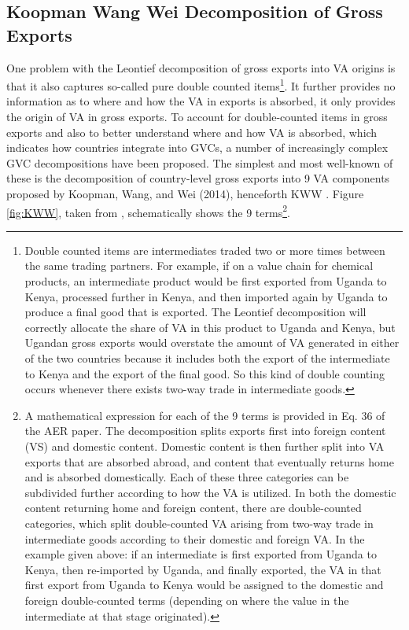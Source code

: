 \documentclass[a4paper]{article}
\begin{document}
\subsection{Koopman Wang Wei Decomposition of Gross Exports}

One problem with the Leontief decomposition of gross exports into VA origins is that it also captures so-called pure double counted items\footnote{Double counted items are intermediates traded two or more times between the same trading partners. For example, if on a value chain for chemical products, an intermediate product would be first exported from Uganda to Kenya, processed further in Kenya, and then imported again by Uganda to produce a final good that is exported. The Leontief decomposition will correctly allocate the share of VA in this product to Uganda and Kenya, but Ugandan gross exports would overstate the amount of VA generated in either of the two countries because it includes both the export of the intermediate to Kenya and the export of the final good. So this kind of double counting occurs whenever there exists two-way trade in intermediate goods.}. It further provides no information as to where and how the VA in exports is absorbed, it only provides the origin of VA in gross exports. To account for double-counted items in gross exports and also to better understand where and how VA is absorbed, which indicates how countries integrate into GVCs, a number of increasingly complex GVC decompositions have been proposed. The simplest and most well-known of these is the decomposition of country-level gross exports into 9 VA components proposed by Koopman, Wang, and Wei (2014), henceforth KWW \citep{koopman2014tracing}. Figure \ref{fig:KWW}, taken from \citet{koopman2014tracing}, schematically shows the 9 terms\footnote{A mathematical expression for each of the 9 terms is provided in Eq. 36 of the \citet{koopman2014tracing} AER paper. The decomposition splits exports first into foreign content (VS) and domestic content. Domestic content is then further split into VA exports that are absorbed abroad, and content that eventually returns home and is absorbed domestically. Each of these three categories can be subdivided further according to how the VA is utilized. In both the domestic content returning home and foreign content, there are double-counted categories, which split double-counted VA arising from two-way trade in intermediate goods according to their domestic and foreign VA. In the example given above: if an intermediate is first exported from Uganda to Kenya, then re-imported by Uganda, and finally exported, the VA in that first export from Uganda to Kenya would be assigned to the domestic and foreign double-counted terms (depending on where the value in the intermediate at that stage originated).}. 
\end{document}

